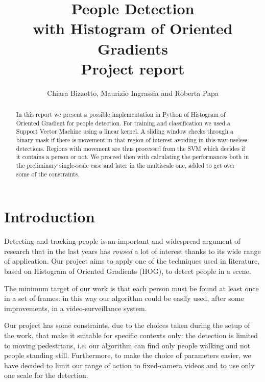 \documentclass[a4paper, 10pt, onecolumn]{article} %
\begin{document}
\title{People Detection \\with Histogram of Oriented Gradients \\
\large Project report}
\author{Chiara Bizzotto, Maurizio Ingrassia and Roberta Papa}

\maketitle

\begin{abstract}
In this report we present a possible implementation in Python of Histogram of Oriented Gradient for people detection. For training and classification we used a Support Vector Machine using a linear kernel. A sliding window checks through a binary mask if there is movement in that region of interest avoiding in this way useless detections. Regions with movement are thus processed from the SVM which decides if it contains a person or not.
We proceed then with calculating the performances both in the preliminary single-scale case and later in the multiscale one, added to get over some of the constraints. 
\end{abstract}

\section{Introduction}
Detecting and tracking people is an important and widespread argument of research that in the last years has \emph{roused} a lot of interest thanks to its wide range of application. Our project aims to apply one of the techniques used in literature, based on Histogram of Oriented Gradients (HOG), to detect people in a scene. 

The minimum target of our work is that each person must be found at least once in a set of frames: in this way our algorithm could be easily used, after some improvements, in a video-surveillance system.

Our project has some constraints, due to the choices taken during the setup of the work, that make it suitable for specific contexts only: the detection is limited to moving pedestrians, i.e. our algorithm can find only people walking and not people standing still. Furthermore, to make the choice of parameters easier, we have decided to limit our range of action to fixed-camera videos and to use only one scale for the detection.
\end{document}
